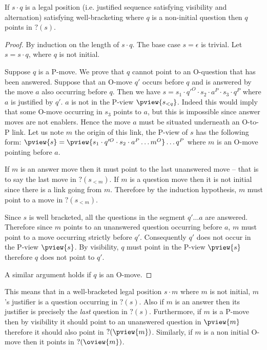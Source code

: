 \begin{lemma}
  If $s\cdot q$ is a legal position (i.e. justified sequence satisfying visibility and alternation) satisfying
    well-bracketing where $q$ is a non-initial question then $q$ points in $?(s)$.
\end{lemma}
\begin{proof}
    By induction on the length of $s \cdot q$. The base case $s=\epsilon$ is trivial.
    Let $s = s\cdot q$, where $q$ is not initial.

    Suppose $q$ is a P-move. We prove that $q$ cannot point to an O-question that has been answered.
    Suppose that an O-move $q'$ occurs before $q$ and is answered by the move $a$ also occurring before $q$.
    Then we have $s = s_1 \cdot q'^O \cdot s_2 \cdot a^P \cdot s_3 \cdot q^P$ where $a$ is justified by $q'$.
    $a$ is not in the P-view $\pview{s_{<q}}$. Indeed this would imply that some O-move occurring in $s_3$ points to $a$, but this is impossible
    since answer moves are not enablers. Hence the move $a$ must be situated underneath an O-to-P link. Let us note $m$ the origin of this link,
    the P-view of $s$ has the following form: $\pview{s} = \pview{s_1\cdot q'^O \cdot s_2 \cdot a^P \ldots m^O} \ldots q^P$ where $m$ is an O-move pointing before $a$.

    If $m$ is an answer move then it must point to the last unanswered move -- that is to say the last move in $?(s_{<m})$.
    If $m$ is a question move then it is not initial since there is a link going from $m$. Therefore by the induction hypothesis, $m$ must point
    to a move in $?(s_{<m})$.

    Since $s$ is well bracketed, all the questions in the segment $q'\ldots a$ are answered.
    Therefore since $m$ points to an unanswered question occurring before $a$, $m$ must
    point to a move occurring strictly before $q'$. Consequently $q'$ does not occur in the P-view $\pview{s}$.
    By visibility, $q$ must point in the P-view $\pview{s}$ therefore $q$ does not point to $q'$.

    A similar argument holds if $q$ is an O-move.
\end{proof}

This means that in a well-bracketed legal position $s\cdot m$ where
$m$ is not initial, $m$'s justifier is a question occurring in
$?(s)$. Also if $m$ is an answer then its justifier is precisely the
\emph{last} question in $?(s)$. Furthermore, if $m$ is a P-move then
by visibility it should point to an unanswered question in
$\pview{m}$ therefore it should also point in $?(\pview{m})$.
Similarly, if $m$ is a non initial O-move then it points in
$?(\oview{m})$.

